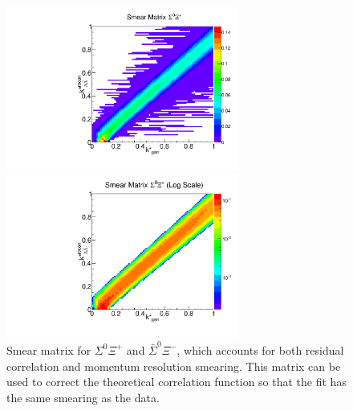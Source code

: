 \begin{figure}[h]
\begin{minipage}{18pc}
\includegraphics[width=18pc]{Figures/SmearMatrices/2016-7-19-SmearMatrixSigmaXiCNormLA.pdf}
\end{minipage}\hspace{2pc}
\begin{minipage}{18pc}
\includegraphics[width=18pc]{Figures/SmearMatrices/2016-7-19-SmearMatrixSigmaXiCNormLALog.pdf}
\end{minipage} 
\caption[Smear matrix -- $\Sigma^0\Xi^{+}$ and $\bar{\Sigma}^0\Xi^{-}$]{\label{fig:SmearLA}
Smear matrix for $\Sigma^0\Xi^{+}$ and $\bar{\Sigma}^0\Xi^{-}$, which accounts for both residual correlation and momentum resolution smearing. This matrix can be used to correct the theoretical correlation function so that the fit has the same smearing as the data.
}
\end{figure}


